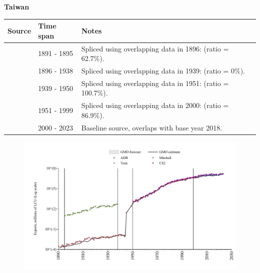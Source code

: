 \documentclass[12pt,a4paper,landscape]{article}
\begin{document}
\begin{adjustbox}{max totalsize={\paperwidth}{\paperheight},center}
\begin{minipage}[t][\textheight][t]{\textwidth}
\vspace*{0.5cm}
{}
\begin{center}
{\Large\bfseries Taiwan}
\end{center}
\vspace{0.5cm}
\begin{table}[H]
\centering
\small
\begin{tabular}{|l|l|l|}
\hline
\textbf{Source} & \textbf{Time span} & \textbf{Notes} \\
\hline
\rowcolor{white}\cite{Mitchell}& 1891 - 1895 &Spliced using overlapping data in 1896: (ratio = 62.7\%).\\
\rowcolor{lightgray}\cite{Tena}& 1896 - 1938 &Spliced using overlapping data in 1939: (ratio = 0\%).\\
\rowcolor{white}\cite{Mitchell}& 1939 - 1950 &Spliced using overlapping data in 1951: (ratio = 100.7\%).\\
\rowcolor{lightgray}\cite{CS2_TWN}& 1951 - 1999 &Spliced using overlapping data in 2000: (ratio = 86.9\%).\\
\rowcolor{white}\cite{ADB}& 2000 - 2023 &Baseline source, overlaps with base year 2018.\\
\hline
\end{tabular}
\end{table}
\begin{figure}[H]
\centering
\includegraphics[width=\textwidth,height=0.6\textheight,keepaspectratio]{graphs/TWN_exports.pdf}
\end{figure}
\end{minipage}
\end{adjustbox}
\end{document}
